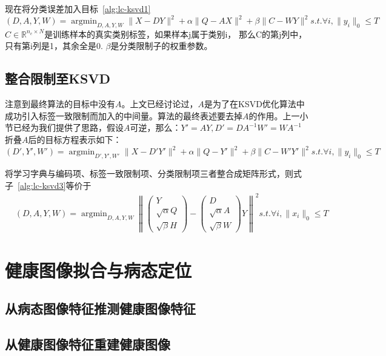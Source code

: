    现在将分类误差加入目标~\ref{alg:lc-ksvd1}
    \begin{equation}
    \label{alg:lc-ksvd2}
    (D, A, Y, W) = \mathop{\arg \min} _{D, A, Y, W} \|X - DY\| ^ 2 + \alpha\|Q - AX\|^2 + \beta\|C - WY\|^2 s.t. \forall i, \|y_i\|_0 \le T
    \end{equation}
    $C\in \mathbb{R}^{n_c \times N}$是训练样本的真实类别标签，如果样本j属于类别i， 那么C的第j列中，只有第i列是1，其余全是0. $\beta$是分类限制子的权重参数。

    \subsection{整合限制至KSVD}
    注意到最终算法的目标中没有$A$。上文已经讨论过，$A$是为了在KSVD优化算法中成功引入标签一致限制而加入的中间量。算法的最终表述要去掉$A$的作用。上一小节已经为我们提供了思路，假设$A$可逆，那么：$Y' = AY, D' = D A^{-1} W' = W A^{-1}$ 折叠$A$后的目标方程表示如下：
    \begin{equation}
    \label{alg:lc-ksvd3}
    (D', Y', W') = \mathop{\arg\min}_{D', Y', W'} \| X - D'Y'\|^2 + \alpha \|Q - Y'\| ^2 + \beta\|C - W' Y' \| ^2 s.t. \forall i, \|y_i\|_0 \le T 
    \end{equation}

    将学习字典与编码项、标签一致限制项、分类限制项三者整合成矩阵形式，则式子~\ref{alg:lc-ksvd3}等价于
    \begin{equation}
    \begin{split}
    & (D, A, Y, W) = \mathop{\arg\min}_{D, A, Y, W} \left\|\begin{pmatrix} Y \\ \sqrt{\alpha} Q \\ \sqrt{\beta}H\end{pmatrix} - \begin{pmatrix} D \\ \sqrt{\alpha} A \\ \sqrt{\beta}W\end{pmatrix} Y\right\| ^2 s.t. \forall i, \|x_i\|_0 \le T
    \end{split}
    \end{equation}

\section{健康图像拟合与病态定位}
\label{sec:norm-recon}
    \subsection{从病态图像特征推测健康图像特征}
    \subsection{从健康图像特征重建健康图像}



